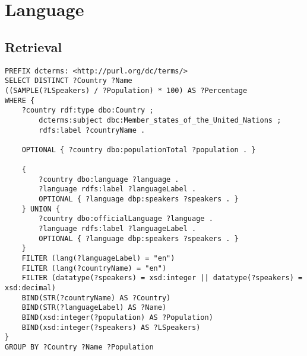 \documentclass[11pt]{article}
\begin{document}
\newpage
\section{Language}

\subsection{Retrieval}
{\footnotesize\begin{verbatim}
PREFIX dcterms: <http://purl.org/dc/terms/>
SELECT DISTINCT ?Country ?Name
((SAMPLE(?LSpeakers) / ?Population) * 100) AS ?Percentage
WHERE {
    ?country rdf:type dbo:Country ;
        dcterms:subject dbc:Member_states_of_the_United_Nations ;
        rdfs:label ?countryName .

    OPTIONAL { ?country dbo:populationTotal ?population . }

    {
        ?country dbo:language ?language .
        ?language rdfs:label ?languageLabel .
        OPTIONAL { ?language dbp:speakers ?speakers . }
    } UNION {
        ?country dbo:officialLanguage ?language .
        ?language rdfs:label ?languageLabel .
        OPTIONAL { ?language dbp:speakers ?speakers . }
    }
    FILTER (lang(?languageLabel) = "en")
    FILTER (lang(?countryName) = "en")
    FILTER (datatype(?speakers) = xsd:integer || datatype(?speakers) = xsd:decimal)
    BIND(STR(?countryName) AS ?Country)
    BIND(STR(?languageLabel) AS ?Name)
    BIND(xsd:integer(?population) AS ?Population)
    BIND(xsd:integer(?speakers) AS ?LSpeakers)
}
GROUP BY ?Country ?Name ?Population
\end{verbatim}}
\end{document}

